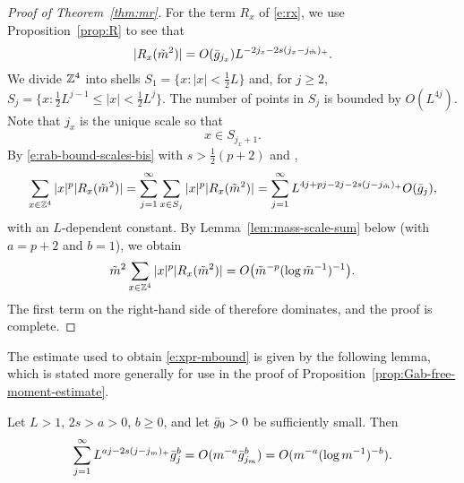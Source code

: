 \begin{proof}[Proof of Theorem~\ref{thm:mr}]
For the term $R_x$ of \eqref{e:rx}, we use Proposition~\ref{prop:R}
to see that
\begin{equation}\label{e:rab-bound-scales-bis}
|R_x(\tilde m^2)|
	=
O(\bar{g}_{j_x})
L^{-2j_x - 2s (j_x - j_{\tilde m})_+}.
\end{equation}
We divide ${\mathbb Z}^4$ into shells $S_1 = \{x : |x| < \frac 12 L\}$ and, for $j \ge 2$,
$S_j = \{x : \frac 12 L^{j-1} \le |x| < \frac 12 L^{j}\}$.
The number of points in $S_j$ is bounded by $O(L^{4j})$.
Note that $j_x$ is the unique scale so that
\begin{equation}
   \label{e:Phi-def-jc}
    x \in S_{j_x +1}
   .
\end{equation}
By \eqref{e:rab-bound-scales-bis} with $s>\frac 12 (p+2)$ and ,
\begin{equation}
\label{e:xpr-shells}
\sum_{x\in{\mathbb Z}^4} |x|^p |R_{x}(\tilde m^2)|
	=
\sum_{j = 1}^\infty\sum_{x\in S_j}   |x|^p |R_{x}(\tilde m^2)| \\
    =
\sum_{j = 1}^\infty L^{4j + pj - 2j - 2s (j - j_{\tilde m})_+} O(\bar{g}_{j}),
\end{equation}
with an $L$-dependent constant.
By Lemma~\ref{lem:mass-scale-sum} below (with $a=p+2$ and $b=1$),
we obtain
\begin{equation}\label{e:xpr-mbound}
\tilde m^2 \sum_{x\in{\mathbb Z}^4} |x|^p |R_{x}(\tilde m^2)|
	=
O\big(\tilde m^{-p}(\log \tilde m^{-1})^{-1}\big).
\end{equation}
The first term on the right-hand side of  therefore dominates,
and the proof is complete.
\end{proof}

The estimate used to obtain \eqref{e:xpr-mbound} is given by the following lemma,
which is stated more generally for use in the proof of Proposition~\ref{prop:Gab-free-moment-estimate}.

\begin{lemma} \label{lem:mass-scale-sum}
Let $L>1$, $2s> a > 0$, $b \geq 0$, and let $\bar{g}_0>0$ be sufficiently small.
Then
\begin{equation} \label{e:gmsumbd}
\sum_{j=1}^\infty L^{aj - 2s (j - j_m)_+}
\bar{g}_j^b = O(m^{-a} \bar{g}_{j_m}^b) = O(m^{-a} (\log m^{-1})^{-b}).
\end{equation}
\end{lemma}

